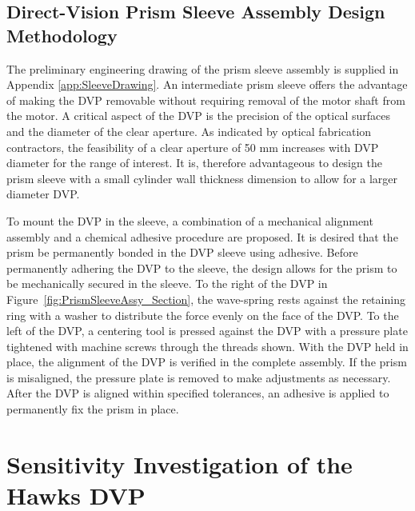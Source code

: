 \subsection{Direct-Vision Prism Sleeve Assembly Design Methodology}
\label{sec:dvpSleeveDesignMethod}
The preliminary engineering drawing of the prism sleeve assembly is supplied in Appendix \autoref{app:SleeveDrawing}. An intermediate prism sleeve offers the advantage of making the DVP removable without requiring removal of the motor shaft from the motor. A critical aspect of the DVP is the precision of the optical surfaces and the diameter of the clear aperture. As indicated by optical fabrication contractors, the feasibility of a clear aperture of 50 mm increases with DVP diameter for the range of interest. It is, therefore advantageous to design the prism sleeve with a small cylinder wall thickness dimension to allow for a larger diameter DVP.

To mount the DVP in the sleeve, a combination of a mechanical alignment assembly and a chemical adhesive procedure are proposed. It is desired that the prism be permanently bonded in the DVP sleeve using adhesive. Before permanently adhering the 
DVP to the sleeve, the design allows for the prism to be mechanically secured in the sleeve. To the right of the DVP in Figure~\ref{fig:PrismSleeveAssy_Section}, the wave-spring rests against the retaining ring with a washer to distribute the force evenly on the face of the DVP. To the left of the DVP, a centering tool is pressed against the DVP with a pressure plate tightened with machine screws through the threads shown. With the DVP held in place, the alignment of the DVP is verified in the complete assembly. If the prism is misaligned, the pressure plate is removed to make adjustments as necessary. After the DVP is aligned within specified tolerances, an adhesive is applied to permanently fix the prism in place.

\section{Sensitivity Investigation of the Hawks DVP}
\label{sec:sensitiveHawks}

